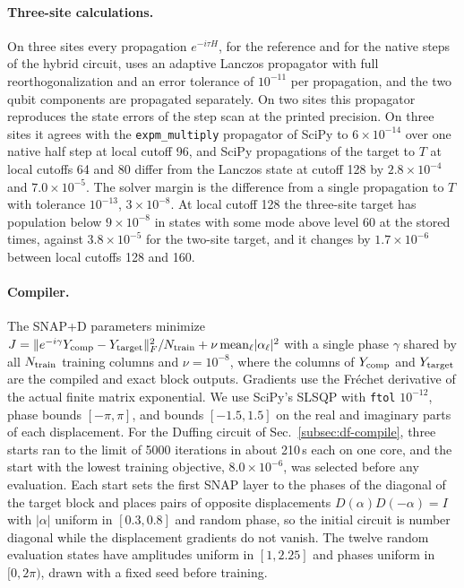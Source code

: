 \documentclass[pra,twocolumn,superscriptaddress,nofootinbib,floatfix]{revtex4-2}
\theoremstyle{remark}
\begin{document}
\paragraph{Three-site calculations.}
On three sites every propagation \(e^{-i\tau H}\), for the reference and for the native steps of the hybrid circuit, uses an adaptive Lanczos propagator \cite{Park1986Lanczos,Hochbruck1997Krylov} with full reorthogonalization and an error tolerance of \(10^{-11}\) per propagation, and the two qubit components are propagated separately. On two sites this propagator reproduces the state errors of the step scan at the printed precision. On three sites it agrees with the \texttt{expm\_multiply} propagator of SciPy to \(6\times10^{-14}\) over one native half step at local cutoff 96, and SciPy propagations of the target to \(T\) at local cutoffs 64 and 80 differ from the Lanczos state at cutoff 128 by \(2.8\times10^{-4}\) and \(7.0\times10^{-5}\). The solver margin is the difference from a single propagation to \(T\) with tolerance \(10^{-13}\), \(3\times10^{-8}\). At local cutoff 128 the three-site target has population below \(9\times10^{-8}\) in states with some mode above level 60 at the stored times, against \(3.8\times10^{-5}\) for the two-site target, and it changes by \(1.7\times10^{-6}\) between local cutoffs 128 and 160.

\paragraph{Compiler.}
The SNAP+D parameters minimize \(J=\|e^{-i\gamma}Y_{\rm comp}-Y_{\rm target}\|_F^2/N_{\rm train}+\nu\,{\rm mean}_\ell|\alpha_\ell|^2\) with a single phase \(\gamma\) shared by all \(N_{\rm train}\) training columns and \(\nu=10^{-8}\), where the columns of \(Y_{\rm comp}\) and \(Y_{\rm target}\) are the compiled and exact block outputs. Gradients use the Fr\'echet derivative of the actual finite matrix exponential. We use SciPy's SLSQP with \texttt{ftol} \(10^{-12}\), phase bounds \([-\pi,\pi]\), and bounds \([-1.5,1.5]\) on the real and imaginary parts of each displacement. For the Duffing circuit of Sec.~\ref{subsec:df-compile}, three starts ran to the limit of 5000 iterations in about 210\,s each on one core, and the start with the lowest training objective, \(8.0\times10^{-6}\), was selected before any evaluation. Each start sets the first SNAP layer to the phases of the diagonal of the target block and places pairs of opposite displacements \(D(\alpha)D(-\alpha)=I\) with \(|\alpha|\) uniform in \([0.3,0.8]\) and random phase, so the initial circuit is number diagonal while the displacement gradients do not vanish. The twelve random evaluation states have amplitudes uniform in \([1,2.25]\) and phases uniform in \([0,2\pi)\), drawn with a fixed seed before training.
\end{document}
